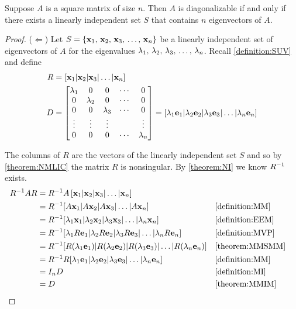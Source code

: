 \documentclass{ximera}
\begin{document}
\begin{theorem}
\label{theorem:DC}

Suppose $A$ is a square matrix of size $n$.  Then $A$ is
diagonalizable if and only if there exists a linearly independent set
$S$ that contains $n$ eigenvectors of $A$.

\begin{proof}
($\Leftarrow$)  Let $S=\left\{\mathbf{x}_{1},\,\mathbf{x}_{2},\,\mathbf{x}_{3},\,\ldots,\,\mathbf{x}_{n}\right\}$ be a linearly independent set of eigenvectors of $A$ for the eigenvalues ${\lambda}_{1},\,{\lambda}_{2},\,{\lambda}_{3},\,\ldots,\,{\lambda}_{n}$.  Recall \ref{definition:SUV} and define
\begin{align*}
R&=\left\lbrack\mathbf{x}_{1}|\mathbf{x}_{2}|\mathbf{x}_{3}|\ldots|\mathbf{x}_{n}\right\rbrack\\
D&=
\begin{bmatrix}
\lambda_1 & 0 & 0 &\cdots & 0\\
 0 &\lambda_2 & 0 &\cdots & 0\\
 0 & 0 &\lambda_3 &\cdots & 0\\
 \vdots & \vdots & \vdots & & \vdots\\
 0 & 0 & 0 &\cdots & \lambda_n
\end{bmatrix}
=[\lambda_1\mathbf{e}_1|\lambda_2\mathbf{e}_2|\lambda_3\mathbf{e}_3|\ldots|\lambda_n\mathbf{e}_n]
\end{align*}

The columns of $R$ are the vectors of the linearly independent set $S$ and so by \ref{theorem:NMLIC} the matrix $R$ is nonsingular.  By \ref{theorem:NI} we know $R^{-1}$ exists.
\begin{align*}
R^{-1}AR&=
R^{-1}A\left\lbrack\mathbf{x}_{1}|\mathbf{x}_{2}|\mathbf{x}_{3}|\ldots|\mathbf{x}_{n}\right\rbrack\\
&=R^{-1}[A\mathbf{x}_1|A\mathbf{x}_2|A\mathbf{x}_3|\ldots|A\mathbf{x}_n]
&&\ref{definition:MM}\\
&=R^{-1}[\lambda_1\mathbf{x}_1|\lambda_2\mathbf{x}_2|\lambda_3\mathbf{x}_3|\ldots|\lambda_n\mathbf{x}_n]
&&\ref{definition:EEM}\\
&=R^{-1}[\lambda_1R\mathbf{e}_1|\lambda_2R\mathbf{e}_2|\lambda_3R\mathbf{e}_3|\ldots|\lambda_nR\mathbf{e}_n]
&&\ref{definition:MVP}\\
&=R^{-1}[R(\lambda_1\mathbf{e}_1)|R(\lambda_2\mathbf{e}_2)|R(\lambda_3\mathbf{e}_3)|\ldots|R(\lambda_n\mathbf{e}_n)]
&&\ref{theorem:MMSMM}\\
&=R^{-1}R[\lambda_1\mathbf{e}_1|\lambda_2\mathbf{e}_2|\lambda_3\mathbf{e}_3|\ldots|\lambda_n\mathbf{e}_n]
&&\ref{definition:MM}\\
&=I_nD
&&\ref{definition:MI}\\
&=D
&&\ref{theorem:MMIM}
\end{align*}


\end{proof}
\end{theorem}
\end{document}
